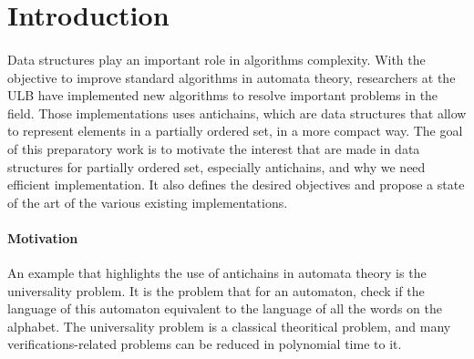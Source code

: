 \documentclass[letterpaper]{article}
\theoremstyle{definition}
\begin{document}
%



\newpage

\tableofcontents

\newpage

\listoftodos

\newpage

\section{Introduction}


\paragraph{}

Data structures play an important role in algorithms complexity.
With the objective to improve standard algorithms in automata theory,
researchers at the ULB
have implemented new algorithms to resolve
important problems in the field. Those implementations uses antichains,
which are data structures that allow to represent elements in a partially
ordered set, in a more compact way.
The goal of this preparatory work is to motivate the interest that
are made in data structures for partially ordered set, especially antichains,
and why we need efficient
implementation.
It also defines the desired objectives
and propose a state of the art of the various existing implementations.

\paragraph{Motivation}

An example that highlights the use of antichains in automata theory is
the universality problem.
It is the problem that for an automaton,
check if the language of this automaton equivalent to the language
of all the words on the alphabet. The universality problem is a classical
theoritical problem, and many verifications-related problems can be
reduced in polynomial time to it.
\end{document}
